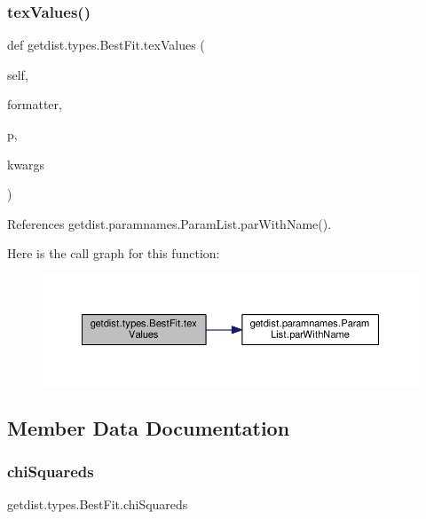 \mbox{\label{classgetdist_1_1types_1_1BestFit_a1799944c35791bd7878e1776383f85c6}} 
\subsubsection{\texorpdfstring{tex\+Values()}{texValues()}}
{\footnotesize\ttfamily def getdist.\+types.\+Best\+Fit.\+tex\+Values (\begin{DoxyParamCaption}\item[{}]{self,  }\item[{}]{formatter,  }\item[{}]{p,  }\item[{}]{kwargs }\end{DoxyParamCaption})}



References getdist.\+paramnames.\+Param\+List.\+par\+With\+Name().

Here is the call graph for this function\+:
\nopagebreak
\begin{figure}[H]
\begin{center}
\leavevmode
\includegraphics[width=350pt]{classgetdist_1_1types_1_1BestFit_a1799944c35791bd7878e1776383f85c6_cgraph}
\end{center}
\end{figure}


\subsection{Member Data Documentation}
\mbox{\label{classgetdist_1_1types_1_1BestFit_a516ce3fe6ffe560c6919a55a69bacf24}} 
\subsubsection{\texorpdfstring{chi\+Squareds}{chiSquareds}}
{\footnotesize\ttfamily getdist.\+types.\+Best\+Fit.\+chi\+Squareds}



